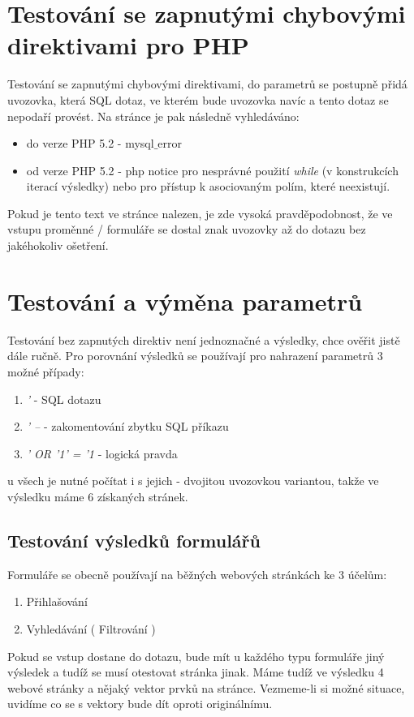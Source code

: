 \documentclass[12pt, a4paper]{report}
\begin{document}
\section{Testování se zapnutými chybovými direktivami pro PHP}
Testování se zapnutými chybovými direktivami, do parametrů se postupně přidá uvozovka, která  SQL dotaz, ve kterém bude uvozovka navíc a tento dotaz se nepodaří provést. Na stránce je pak následně vyhledáváno:
\begin{itemize}
\item do verze PHP 5.2 - mysql$\_$error
\item od verze PHP 5.2 - php notice pro nesprávné použití \textit{while} (v konstrukcích iterací výsledky) nebo pro přístup k asociovaným polím, které neexistují.
\end{itemize}
Pokud je tento text ve stránce nalezen, je zde vysoká pravděpodobnost, že ve vstupu proměnné / formuláře se dostal znak uvozovky až do dotazu bez jakéhokoliv ošetření.

\section{Testování a výměna parametrů}
Testování bez zapnutých direktiv není jednoznačné a výsledky, chce ověřit jistě dále ručně. Pro porovnání výsledků se používají pro nahrazení parametrů 3 možné případy:
\begin{enumerate}
\item \textit{'} -  SQL dotazu
\item \textit{' --} - zakomentování zbytku SQL příkazu
\item \textit{' OR '1' = '1} - logická pravda
\end{enumerate}
u všech je nutné počítat i s jejich  - dvojitou uvozovkou variantou, takže ve výsledku máme 6 získaných stránek.

\subsection{Testování výsledků formulářů}
Formuláře se obecně používají na běžných webových stránkách ke 3 účelům:
\begin{enumerate}
\item Přihlašování
\item Vyhledávání ( Filtrování )
\end{enumerate}
Pokud se  vstup dostane do dotazu, bude mít u každého typu formuláře jiný výsledek a tudíž se musí otestovat stránka jinak. Máme tudíž ve výsledku 4 webové stránky a nějaký vektor prvků na stránce. Vezmeme-li si možné situace, uvidíme co se s vektory bude dít oproti originálnímu.
\end{document}
